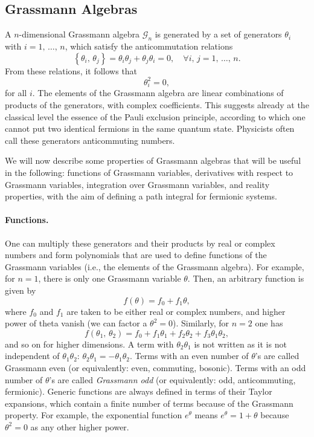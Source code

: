 \subsection{Grassmann Algebras}

A \(n\)-dimensional Grassmann algebra \(\mathcal{G}_n\) is generated by a set of generators \(\theta_i\) with \(i=1,\,\ldots,\,n\), which satisfy the anticommutation relations
\[
    \left\{ \theta_i,\,\theta_j \right\} = \theta_i \theta_j + \theta_j \theta_i = 0, \quad \forall i,\,j = 1,\,\ldots,\,n.
\]
From these relations, it follows that
\[
    \theta_i^2 = 0,
\]
for all \(i\). The elements of the Grassmann algebra are linear combinations of products of the generators, with complex coefficients. This suggests already at the classical level the essence of the Pauli exclusion principle, according to which one cannot put two identical fermions in the same quantum state. Physicists often call these generators anticommuting numbers.

We will now describe some properties of Grassmann algebras that will be useful in the following: functions of Grassmann variables, derivatives with respect to Grassmann variables, integration over Grassmann variables, and reality properties, with the aim of defining a path integral for fermionic systems.

\paragraph{Functions.}
One can multiply these generators and their products by real or complex numbers and form polynomials that are used to define functions of the Grassmann variables (i.e., the elements of the Grassmann algebra). For example, for \(n=1\), there is only one Grassmann variable \(\theta\). Then, an arbitrary function is given by
\[
    f(\theta) = f_0 + f_1 \theta,
\]
where \(f_0\) and \(f_1\) are taken to be either real or complex numbers, and higher power of theta vanish (we can factor a \(\theta^2 = 0\)). Similarly, for \(n=2\) one has
\[
    f(\theta_1,\,\theta_2) = f_0 + f_1 \theta_1 + f_2 \theta_2 + f_{3} \theta_1 \theta_2,
\]
and so on for higher dimensions. A term with \(\theta_2 \theta_1\) is not written as it is not independent of \(\theta_1 \theta_2\): \(\theta_2 \theta_1 = -\theta_1 \theta_2\). Terms with an even number of \(\theta\)’s are called Grassmann even (or equivalently: even, commuting, bosonic). Terms with an odd number of \(\theta\)’s are called \textit{Grassmann odd} (or equivalently: odd, anticommuting, fermionic). Generic functions are always defined in terms of their Taylor expansions, which contain a finite number of terms because of the Grassmann property. For example, the exponential function \(e^{\theta} \) means \(e^\theta = 1 + \theta\) because \(\theta^2 = 0\) as any other higher power.

